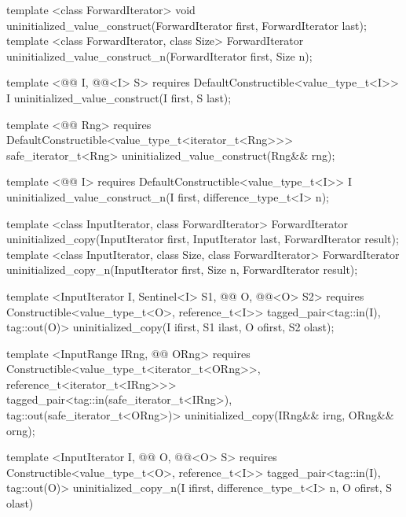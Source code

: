 {\color{remclr}
\begin{codeblock}
template <class ForwardIterator>
  void uninitialized_value_construct(ForwardIterator first, ForwardIterator last);
template <class ForwardIterator, class Size>
  ForwardIterator uninitialized_value_construct_n(ForwardIterator first, Size n);
\end{codeblock}
} %
{\color{addclr}
\begin{codeblock}
template <@@ I, @@<I> S>
  requires
DefaultConstructible<value_type_t<I>>
  I uninitialized_value_construct(I first, S last);

template <@@ Rng>
  requires
DefaultConstructible<value_type_t<iterator_t<Rng>>>
  safe_iterator_t<Rng> uninitialized_value_construct(Rng&& rng);

template <@@ I>
  requires
DefaultConstructible<value_type_t<I>>
  I uninitialized_value_construct_n(I first, difference_type_t<I> n);
\end{codeblock}
} %

{\color{remclr}
\begin{codeblock}
template <class InputIterator, class ForwardIterator>
  ForwardIterator uninitialized_copy(InputIterator first, InputIterator last,
                                     ForwardIterator result);
template <class InputIterator, class Size, class ForwardIterator>
  ForwardIterator uninitialized_copy_n(InputIterator first, Size n,
                                       ForwardIterator result);
\end{codeblock}
} %
{\color{addclr}
\begin{codeblock}
template <InputIterator I, Sentinel<I> S1, @@ O, @@<O> S2>
  requires
Constructible<value_type_t<O>, reference_t<I>>
  tagged_pair<tag::in(I), tag::out(O)>
uninitialized_copy(I ifirst, S1 ilast, O ofirst, S2 olast);

template <InputRange IRng, @@ ORng>
  requires
Constructible<value_type_t<iterator_t<ORng>>, reference_t<iterator_t<IRng>>>
  tagged_pair<tag::in(safe_iterator_t<IRng>), tag::out(safe_iterator_t<ORng>)>
uninitialized_copy(IRng&& irng, ORng&& orng);

template <InputIterator I, @@ O, @@<O> S>
  requires
Constructible<value_type_t<O>, reference_t<I>>
  tagged_pair<tag::in(I), tag::out(O)>
uninitialized_copy_n(I ifirst, difference_type_t<I> n, O ofirst, S olast)
\end{codeblock}
} %

